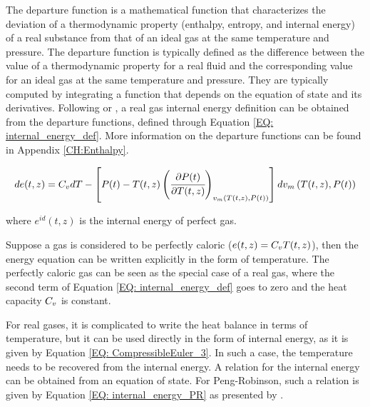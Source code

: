 \documentclass[../Article_Model_Parameters.tex]{subfiles}
\begin{document}
			The departure function is a mathematical function that characterizes the deviation of a thermodynamic property (enthalpy, entropy, and internal energy) of a real substance from that of an ideal gas at the same temperature and pressure. The departure function is typically defined as the difference between the value of a thermodynamic property for a real fluid and the corresponding value for an ideal gas at the same temperature and pressure. They are typically computed by integrating a function that depends on the equation of state and its derivatives. Following \citet{Elliott2011} or \citet{Gmehling2019}, a real gas internal energy definition can be obtained from the departure functions, defined through Equation \ref{EQ: internal_energy_def}. More information on the departure functions can be found in Appendix \ref{CH:Enthalpy}.

			{\footnotesize
				\begin{equation}
					de(t,z)=C_vdT-\left[{\color{black}P}(t)-T(t,z)\left(\cfrac{\partial {\color{black}P}(t)}{\partial T(t,z)}\right)_{{\color{black}v_m}\left(T(t,z), {\color{black}P}(t)\right)}\right]d{\color{black}v_m}\left(T(t,z), {\color{black}P}(t)\right)
					\label{EQ: internal_energy_def}
				\end{equation} }
			
			where $e^{id}(t,z)$ is the internal energy of perfect gas.
			
			Suppose a gas is considered to be perfectly caloric ($e(t,z)={\color{black}C_v} T(t,z)$), then the energy equation can be written explicitly in the form of temperature. The perfectly caloric gas can be seen as the special case of a real gas, where the second term of Equation \ref{EQ: internal_energy_def} goes to zero and the heat capacity ${\color{black}C_v}$ is constant.
			
			For real gases, it is complicated to write the heat balance in terms of temperature, but it can be used directly in the form of internal energy, as it is given by Equation \ref{EQ: CompressibleEuler_3}. In such a case, the temperature needs to be recovered from the internal energy. A relation for the internal energy can be obtained from an equation of state. For Peng-Robinson, such a relation is given by Equation \ref{EQ: internal_energy_PR} as presented by \citet{Elliott2011}.
			
		
\end{document}
